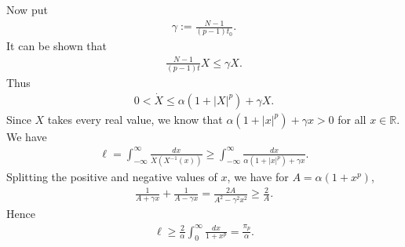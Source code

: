 \documentclass[11pt]{amsart}
\theoremstyle{definition}
\begin{document}
Now put 
\begin{align*}
    \gamma:=\frac{N-1}{(p-1)t_0}.
\end{align*}
It can be shown that
\begin{align*}
    \frac{N-1}{(p-1)t}X\leq \gamma X.
\end{align*}
Thus
\begin{align*}
    0<\dot{X}\leq \alpha(1+|X|^p)+\gamma X.
\end{align*}
Since $X$ takes every real value, we know that $\alpha(1+|x|^p)+\gamma x>0$ for all $x \in \mathbb{R}$. We have
\begin{align*}
    \ell=\int_{-\infty}^\infty\frac{dx}{\dot{X}(X^{-1}(x))}\geq \int_{-\infty}^{\infty}\frac{dx}{\alpha(1+|x|^p)+\gamma x}.
\end{align*}
Splitting the positive and negative values of $x$, we have for $A=\alpha(1+x^p)$, 
\begin{align*}
    \frac{1}{A+\gamma x}+\frac{1}{A-\gamma x}=\frac{2A}{A^2-\gamma^2 x^2}\geq \frac{2}{A}.
\end{align*}
Hence
\begin{align*}
    \ell \geq \frac{2}{\alpha}\int_0^\infty \frac{dx}{1+x^p}=\frac{\pi_p}{\alpha}.
\end{align*}

\end{document}
